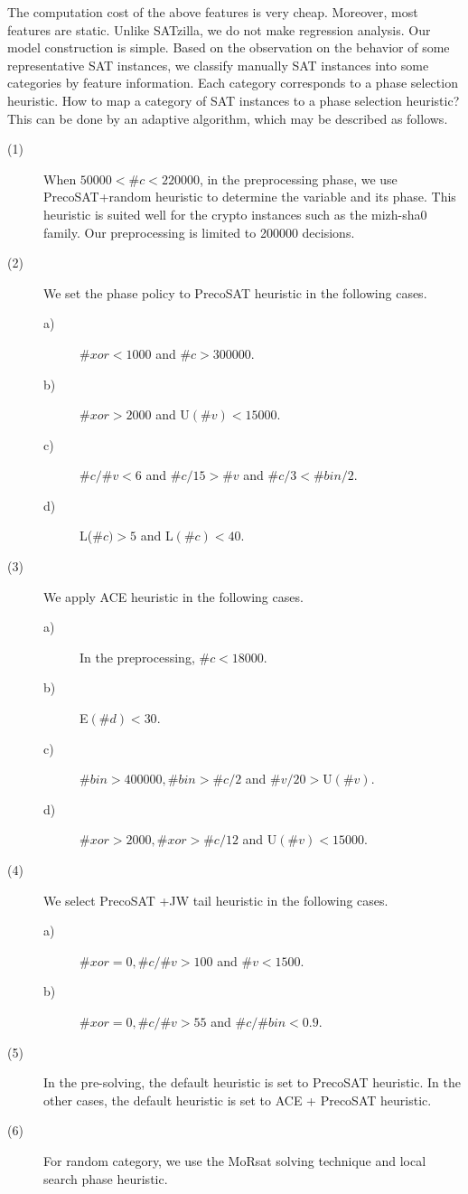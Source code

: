 \documentclass{llncs}
\begin{document}
The computation cost of the above features is very cheap. Moreover,
most features are static. Unlike SATzilla, we do not make regression
analysis. Our model construction is simple. Based on the observation
on the behavior of some representative SAT instances, we classify
manually SAT instances into some categories by feature information.
Each category corresponds to a phase selection heuristic. How to map
a category of SAT instances to a phase selection heuristic? This can
be done by an adaptive algorithm, which may be described as follows.

\begin{description}
\item [(1)] When $50000<\#c<220000$, in the preprocessing phase, we use
PrecoSAT+random heuristic to determine the variable and its phase.
This heuristic is suited well for the crypto instances such as the
mizh-sha0 family. Our preprocessing is limited to 200000 decisions.

\item [(2)] We set the phase policy to PrecoSAT heuristic in the following
cases.
\begin{description}
\item [a)] $\#xor < 1000$ and $\#c > 300000$.
\item [b)] $\#xor > 2000$ and U$(\#v) < 15000$.
\item [c)] $\#c / \#v < 6$ and $\#c / 15 > \#v$ and $\#c/3 < \#bin/2$.
\item [d)] L($\#c)> 5$ and L$(\#c) < 40$.
\end{description}

 \item [(3)] We apply ACE heuristic in the following cases.
\begin{description}
\item [a)] In the preprocessing, $\#c < 18000$.
\item [b)] E$(\#d) < 30$.
\item [c)] $\#bin > 400000, \#bin > \#c/2$ and $\#v/20 > \mathrm{U}(\#v)$.
\item [d)] $\#xor > 2000, \#xor > \#c / 12$ and U$(\#v) < 15000$.
\end{description}

\item [(4)] We select PrecoSAT +JW tail heuristic in the following cases.
\begin{description}
\item [a)] $\#xor=0, \#c / \#v > 100$ and $\#v < 1500$.
\item [b)] $\#xor=0, \#c / \#v > 55$ and $\#c / \#bin < 0.9$.
\end{description}

\item [(5)] In the pre-solving, the default heuristic is set to PrecoSAT
heuristic. In the other cases, the default heuristic is set to ACE +
PrecoSAT heuristic.

 \item [(6)] For random category, we use the MoRsat \cite {MoRsat:15} solving technique and
 local search phase heuristic.

\end{description}
\end{document}
